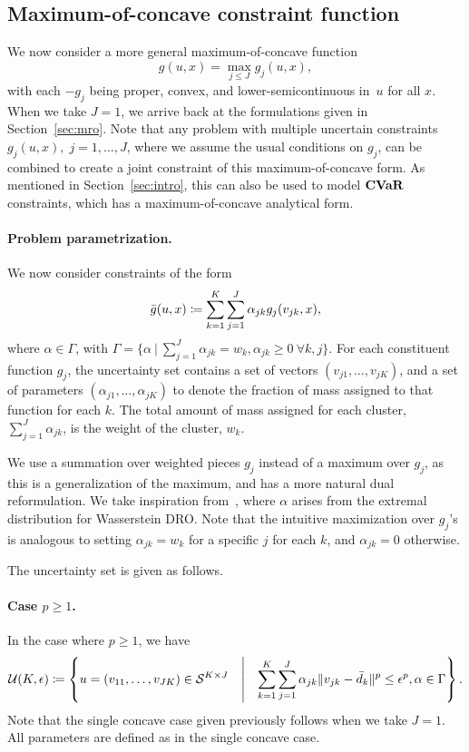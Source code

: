 \documentclass[12pt]{article}
\newcommand{\citep}{\cite}
\theoremstyle{thmstyleone}%
\theoremstyle{thmstyletwo}%
\theoremstyle{thmstylethree}%
\newcommand{\reviewChanges}{}
\begin{document}
\subsection{\reviewChanges{Maximum-of-concave constraint function}}
\label{sec:max_concave}
\reviewChanges{We now consider a more general maximum-of-concave function 
$$g(u, x) = \max_{j\leq J}g_j(u, x),$$ with each $-g_j$ being proper, convex, and lower-semicontinuous in~$u$ for all $x$. When we take $J=1$, we arrive back at the formulations given in Section~\ref{sec:mro}.
Note that any problem with multiple uncertain constraints ${g_j(u,x),\; j = 1,\hdots,J}$, where we assume the usual conditions on $g_j$, can be combined to create a joint constraint of this maximum-of-concave form. 
As mentioned in Section~\ref{sec:intro}, this can also be used to model $\mathop{\bf CVaR}$ constraints, which has a maximum-of-concave analytical form.}

\paragraph{\reviewChanges{Problem parametrization.}}
\reviewChanges{We now consider constraints of the form
\begin{equation}
	\label{eq:constraints_max}
\bar{g}(u, x) \coloneqq  \sum_{k=1}^K\sum_{j=1}^J \alpha_{jk} g_j(v_{jk}, x),
\end{equation}
where $\alpha\in \Gamma $, with $\Gamma = \{\alpha~|~\sum_{j=1}^J\alpha_{jk}= w_k, \alpha_{jk}\geq 0 ~\forall k,j\}$. For each constituent function $g_j$, the uncertainty set contains a set of vectors $(v_{j1},\dots,v_{jK})$, and a set of parameters $(\alpha_{j1},\dots, \alpha_{jK})$ to denote the fraction of mass assigned to that function for each $k$. The total amount of mass assigned for each cluster, $\sum_{j=1}^J\alpha_{jk}$, is the weight of the cluster, $w_k$. }

\reviewChanges{We use a summation over weighted pieces $g_j$ instead of a maximum over $g_j$, as this is a generalization of the maximum, and has a more natural dual reformulation. We take inspiration from~\citep[Section 4.2]{mohajerin_esfahani_data-driven_2018}, where $\alpha$ arises from the extremal distribution for Wasserstein \gls{DRO}.
Note that the intuitive maximization over $g_j$'s is analogous to setting $\alpha_{jk} = w_k$ for a specific $j$ for each $k$, and $\alpha_{jk} = 0$ otherwise.}

\reviewChanges{The uncertainty set is given as follows.}
\reviewChanges{
\paragraph{Case $p \geq 1$.}
In the case where $p \geq 1$, we have
\begin{equation*}
	\label{eq:uncset_p_max}
	{\mathcal{U}}(K, \epsilon) \coloneqq \left\{ u = (v_{11},\dots,v_{JK}) \in \mathcal{S}^{K\times J} \quad\middle|\quad \sum_{k=1}^K \sum_{j=1}^J \alpha_{jk} \| v_{jk} - \bar{d}_k \|^p \le \epsilon^p,\alpha \in \Gamma \right\}.
\end{equation*}
Note that the single concave case given previously follows when we take $J = 1$. All parameters are defined as in the single concave case.}
\end{document}
